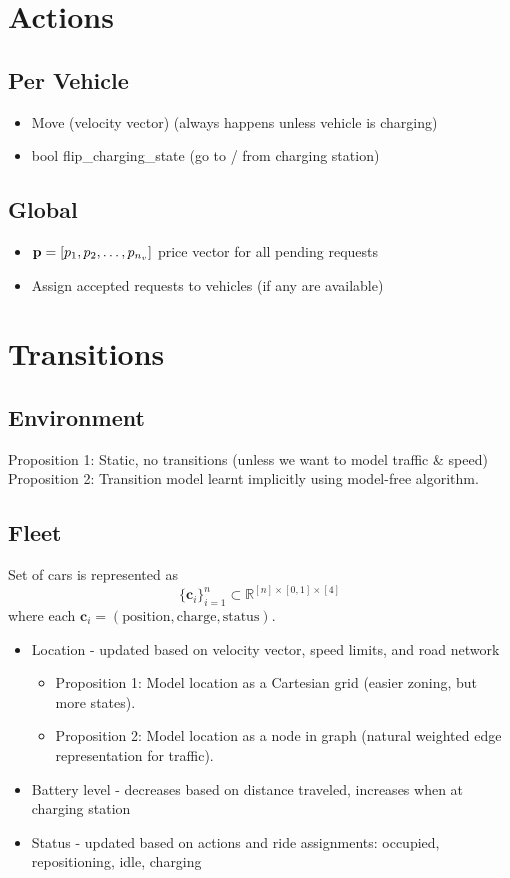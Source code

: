 \documentclass[12pt]{article}
\begin{document}
\newpage
\section*{Actions}
\subsection*{Per Vehicle}
\begin{itemize}
		\item Move (velocity vector) (always happens unless vehicle is charging)
		\item bool flip\_charging\_state (go to / from charging station)
\end{itemize}

\subsection*{Global}
\begin{itemize}
		\item $\mathbf{p} = [p_1, p_2, \ldots, p_{n_v}]$ price vector for all pending requests
		\item Assign accepted requests to vehicles (if any are available)
\end{itemize}

\section*{Transitions}
\subsection*{Environment}
Proposition 1: Static, no transitions (unless we want to model traffic \& speed) \\
Proposition 2: Transition model learnt implicitly using model-free algorithm.
\subsection*{Fleet}
Set of cars is represented as \[\{ \mathbf{c}_i \}_{i=1}^{n} \subset \mathbb{R}^{[n]
\times [0,1] \times [4]} \] where each $\mathbf{c}_i = (\text{position}, \text{charge},
\text{status})$.\\
\begin{itemize}
		\item Location - updated based on velocity vector, speed limits, and road network
				\begin{itemize}
						\item Proposition 1: Model location as a Cartesian grid (easier zoning, but more states).
						\item Proposition 2: Model location as a node in graph (natural weighted edge
								representation for traffic).
				\end{itemize}
		\item Battery level - decreases based on distance traveled, increases when at charging station
		\item Status - updated based on actions and ride assignments: occupied, repositioning,
				idle, charging
\end{itemize}
\end{document}
